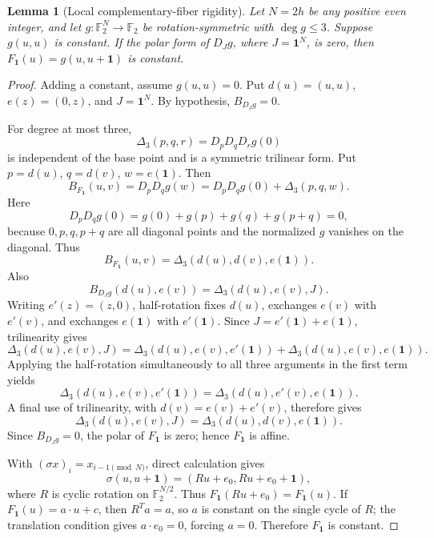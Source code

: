 \documentclass[11pt,a4paper]{article}
\newtheorem{lemma}[theorem]{Lemma}
\newcommand{\F}{\mathbb F_2}
\begin{document}
\begin{lemma}[Local complementary-fiber rigidity]\label{lem:fiber-rigidity}
Let \(N=2h\) be any positive even integer, and let \(g:\F^N\to\F\) be rotation-symmetric with \(\deg g\le3\). Suppose \(g(u,u)\) is constant. If the polar form of \(D_Jg\), where \(J=\mathbf1^N\), is zero, then \(F_{\mathbf1}(u)=g(u,u+\mathbf1)\) is constant.
\end{lemma}
\begin{proof}
Adding a constant, assume \(g(u,u)=0\). Put \(d(u)=(u,u)\), \(e(z)=(0,z)\), and \(J=\mathbf1^N\). By hypothesis, \(B_{D_Jg}=0\).

For degree at most three,
\[
\Delta_3(p,q,r)=D_pD_qD_rg(0)
\]
is independent of the base point and is a symmetric trilinear form. Put \(p=d(u)\), \(q=d(v)\), \(w=e(\mathbf1)\). Then
\[
B_{F_{\mathbf1}}(u,v)=D_pD_qg(w)
=D_pD_qg(0)+\Delta_3(p,q,w).
\]
Here
\[
D_pD_qg(0)=g(0)+g(p)+g(q)+g(p+q)=0,
\]
because \(0,p,q,p+q\) are all diagonal points and the normalized \(g\) vanishes on the diagonal. Thus
\[
B_{F_{\mathbf1}}(u,v)=\Delta_3(d(u),d(v),e(\mathbf1)).
\]
Also
\[
B_{D_Jg}(d(u),e(v))=\Delta_3(d(u),e(v),J).
\]
Writing \(e'(z)=(z,0)\), half-rotation fixes \(d(u)\), exchanges \(e(v)\) with \(e'(v)\), and exchanges \(e(\mathbf1)\) with \(e'(\mathbf1)\). Since \(J=e'(\mathbf1)+e(\mathbf1)\), trilinearity gives
\[
\Delta_3(d(u),e(v),J)
=\Delta_3(d(u),e(v),e'(\mathbf1))
 +\Delta_3(d(u),e(v),e(\mathbf1)).
\]
Applying the half-rotation simultaneously to all three arguments in the first term yields
\[
\Delta_3(d(u),e(v),e'(\mathbf1))
=\Delta_3(d(u),e'(v),e(\mathbf1)).
\]
A final use of trilinearity, with \(d(v)=e(v)+e'(v)\), therefore gives
\[
\Delta_3(d(u),e(v),J)
=\Delta_3(d(u),d(v),e(\mathbf1)).
\]
Since \(B_{D_Jg}=0\), the polar of \(F_{\mathbf1}\) is zero; hence \(F_{\mathbf1}\) is affine.

With \((\sigma x)_i=x_{i-1\pmod N}\), direct calculation gives
\[
\sigma(u,u+\mathbf1)=(Ru+e_0,Ru+e_0+\mathbf1),
\]
where \(R\) is cyclic rotation on \(\F^{N/2}\). Thus \(F_{\mathbf1}(Ru+e_0)=F_{\mathbf1}(u)\). If \(F_{\mathbf1}(u)=a\cdot u+c\), then \(R^Ta=a\), so \(a\) is constant on the single cycle of \(R\); the translation condition gives \(a\cdot e_0=0\), forcing \(a=0\). Therefore \(F_{\mathbf1}\) is constant.
\end{proof}
\end{document}
